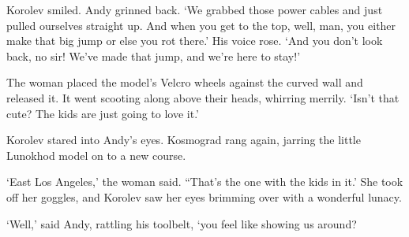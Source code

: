 Korolev smiled. Andy grinned back. ‘We grabbed those power cables and just pulled ourselves straight up. And when you get to the top, well, man, you either make that big jump or else you rot there.’ His voice rose. ‘And you don’t look back, no sir! We’ve made that jump, and we’re here to stay!’

The woman placed the model’s Velcro wheels against the curved wall and released it. It went scooting along above their heads, whirring merrily. ‘Isn’t that cute? The kids are just going to love it.’

Korolev stared into Andy’s eyes. Kosmograd rang again, jarring the little Lunokhod model on to a new course.

‘East Los Angeles,’ the woman said. “That’s the one with the kids in it.’ She took off her goggles, and Korolev saw her eyes brimming over with a wonderful lunacy.

‘Well,’ said Andy, rattling his toolbelt, ‘you feel like showing us around?